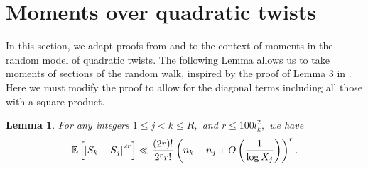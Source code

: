 \documentclass[12pt]{amsart}
\def\E{\ensuremath\mathbb{E}}
\numberwithin{equation}{section}
\newtheorem{lem}[thm]{Lemma}
\numberwithin{thm}{section}
\newcommand{\1}{\mathbf 1}
\begin{document}
\section{Moments over quadratic twists}\label{Sec: moments}
In this section, we adapt proofs from \cite{AB24} and \cite{AC25} to the context of moments in the random model of quadratic twists. The following Lemma allows us to take moments of sections of the random walk, inspired by the proof of Lemma 3 in \cite{Sound}. Here we must modify the proof to allow for the diagonal terms including all those with a square product.
\begin{lem}\label{walkmom}
	For any integers $1\le j< k\le R,$ and $r\le {100l_k^2},$ 
	we have 	\begin{equation}
		\E\left[\left|S_{k}-S_{j}\right|^{2r}\right]\ll \frac{(2r)!}{2^rr!}\left(n_k-n_{j}+O\left(\frac{1}{\log X_j}\right)\right)^r. 
	\end{equation}
\end{lem}
\end{document}
